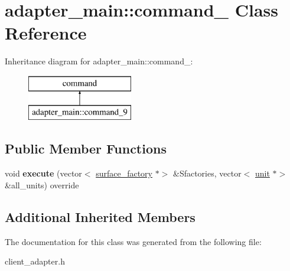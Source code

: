 \hypertarget{classadapter__main_1_1command__9}{}\section{adapter\+\_\+main\+:\+:command\+\_ Class Reference}
\label{classadapter__main_1_1command__9}
Inheritance diagram for adapter\+\_\+main\+:\+:command\+\_\+:\begin{figure}[H]
\begin{center}
\leavevmode
\includegraphics[height=2.000000cm]{classadapter__main_1_1command__9}
\end{center}
\end{figure}
\subsection*{Public Member Functions}
\begin{DoxyCompactItemize}
\item 
\mbox{\label{classadapter__main_1_1command__9_a74655d2394d36bfe34e0fa11d969fcbd}} 
void {\bfseries execute} (vector$<$ \mbox{\hyperlink{classsurface__factory}{surface\+\_\+factory}} $\ast$$>$ \&Sfactories, vector$<$ \mbox{\hyperlink{classunit}{unit}} $\ast$$>$ \&all\+\_\+units) override
\end{DoxyCompactItemize}
\subsection*{Additional Inherited Members}


The documentation for this class was generated from the following file\+:\begin{DoxyCompactItemize}
\item 
client\+\_\+adapter.\+h\end{DoxyCompactItemize}
